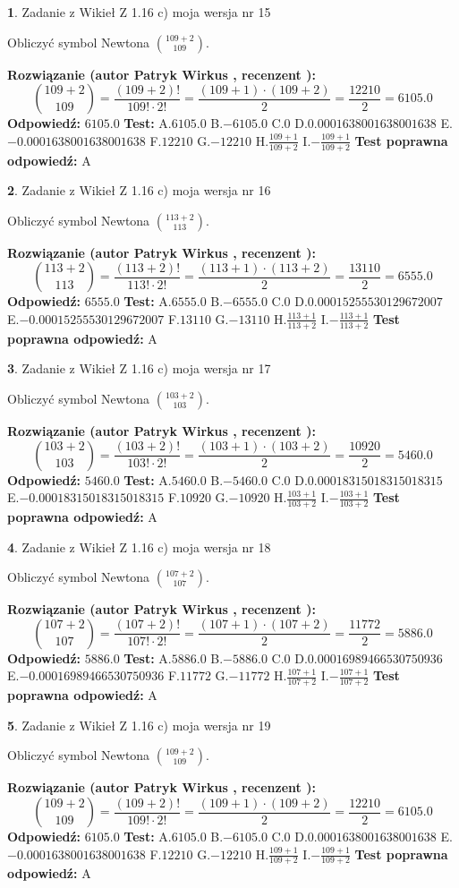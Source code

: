 \documentclass[12pt, a4paper]{article}
\theoremstyle{definition} %
\newtheorem{zad}{}
\newcommand{\zadStart}[1]{\begin{zad}#1\newline}
\newcommand{\zadStop}{\end{zad}}
\newcommand{\rozwStart}[2]{\noindent \textbf{Rozwiązanie (autor #1 , recenzent #2): }\newline}
\newcommand{\rozwStop}{\newline}
\newcommand{\odpStart}{\noindent \textbf{Odpowiedź:}\newline}
\newcommand{\odpStop}{\newline}
\newcommand{\testStart}{\noindent \textbf{Test:}\newline}
\newcommand{\testStop}{\newline}
\newcommand{\kluczStart}{\noindent \textbf{Test poprawna odpowiedź:}\newline}
\newcommand{\kluczStop}{\newline}
\begin{document}
\zadStart{Zadanie z Wikieł Z 1.16 c) moja wersja nr 15}

Obliczyć symbol Newtona ${109+2 \choose 109}$.
\zadStop
\rozwStart{Patryk Wirkus}{}
$${109+2 \choose 109} = \frac{(109+2)!}{109! \cdot 2!} = \frac{(109+1)\cdot(109+2)}{2} = \frac{12210}{2} = 6105.0$$
\rozwStop
\odpStart
$6105.0$
\odpStop
\testStart
A.$6105.0$ B.$-6105.0$ C.$0$ D.$0.0001638001638001638$ E.$-0.0001638001638001638$
F.$12210$ G.$-12210$
H.$\frac{109+1}{109+2}$
I.$-\frac{109+1}{109+2}$
\testStop
\kluczStart
A
\kluczStop



\zadStart{Zadanie z Wikieł Z 1.16 c) moja wersja nr 16}

Obliczyć symbol Newtona ${113+2 \choose 113}$.
\zadStop
\rozwStart{Patryk Wirkus}{}
$${113+2 \choose 113} = \frac{(113+2)!}{113! \cdot 2!} = \frac{(113+1)\cdot(113+2)}{2} = \frac{13110}{2} = 6555.0$$
\rozwStop
\odpStart
$6555.0$
\odpStop
\testStart
A.$6555.0$ B.$-6555.0$ C.$0$ D.$0.00015255530129672007$ E.$-0.00015255530129672007$
F.$13110$ G.$-13110$
H.$\frac{113+1}{113+2}$
I.$-\frac{113+1}{113+2}$
\testStop
\kluczStart
A
\kluczStop



\zadStart{Zadanie z Wikieł Z 1.16 c) moja wersja nr 17}

Obliczyć symbol Newtona ${103+2 \choose 103}$.
\zadStop
\rozwStart{Patryk Wirkus}{}
$${103+2 \choose 103} = \frac{(103+2)!}{103! \cdot 2!} = \frac{(103+1)\cdot(103+2)}{2} = \frac{10920}{2} = 5460.0$$
\rozwStop
\odpStart
$5460.0$
\odpStop
\testStart
A.$5460.0$ B.$-5460.0$ C.$0$ D.$0.00018315018315018315$ E.$-0.00018315018315018315$
F.$10920$ G.$-10920$
H.$\frac{103+1}{103+2}$
I.$-\frac{103+1}{103+2}$
\testStop
\kluczStart
A
\kluczStop



\zadStart{Zadanie z Wikieł Z 1.16 c) moja wersja nr 18}

Obliczyć symbol Newtona ${107+2 \choose 107}$.
\zadStop
\rozwStart{Patryk Wirkus}{}
$${107+2 \choose 107} = \frac{(107+2)!}{107! \cdot 2!} = \frac{(107+1)\cdot(107+2)}{2} = \frac{11772}{2} = 5886.0$$
\rozwStop
\odpStart
$5886.0$
\odpStop
\testStart
A.$5886.0$ B.$-5886.0$ C.$0$ D.$0.00016989466530750936$ E.$-0.00016989466530750936$
F.$11772$ G.$-11772$
H.$\frac{107+1}{107+2}$
I.$-\frac{107+1}{107+2}$
\testStop
\kluczStart
A
\kluczStop



\zadStart{Zadanie z Wikieł Z 1.16 c) moja wersja nr 19}

Obliczyć symbol Newtona ${109+2 \choose 109}$.
\zadStop
\rozwStart{Patryk Wirkus}{}
$${109+2 \choose 109} = \frac{(109+2)!}{109! \cdot 2!} = \frac{(109+1)\cdot(109+2)}{2} = \frac{12210}{2} = 6105.0$$
\rozwStop
\odpStart
$6105.0$
\odpStop
\testStart
A.$6105.0$ B.$-6105.0$ C.$0$ D.$0.0001638001638001638$ E.$-0.0001638001638001638$
F.$12210$ G.$-12210$
H.$\frac{109+1}{109+2}$
I.$-\frac{109+1}{109+2}$
\testStop
\kluczStart
A
\kluczStop
\end{document}
